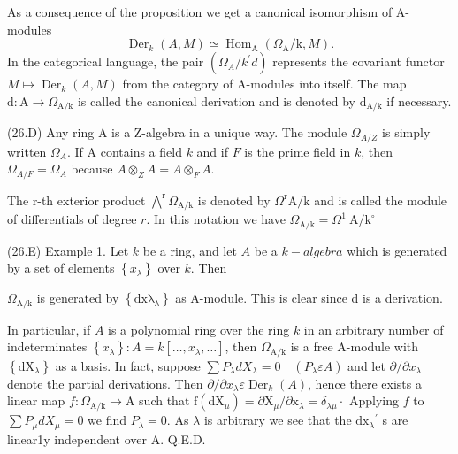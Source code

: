As a consequence of the proposition we get a canonical isomorphism of A-modules
$$
\operatorname{Der}_{k}(A, M) \simeq \operatorname{Hom}_{\mathrm{A}}\left(\Omega_{\mathrm{A}} / \mathrm{k}, M\right) .
$$
In the categorical language, the pair $\left(\Omega_{A} / k^{\prime} d\right)$ represents the covariant functor $M \mapsto \operatorname{Der}_{k}(A, M)$ from the category of A-modules into itself. The map $\mathrm{d}: \mathrm{A} \rightarrow \Omega_{\mathrm{A} / \mathrm{k}}$ is called the canonical derivation and is denoted by $\mathrm{d}_{\mathrm{A} / \mathrm{k}}$ if necessary.

(26.D) Any ring A is a Z-algebra in a unique way. The module $\Omega_{A / Z}$ is simply written $\Omega_{A}$. If A contains a field $k$ and if $F$ is the prime field in $k$, then $\Omega_{A / F}=\Omega_{A}$ because $A \otimes_{Z} A=A \otimes_{F} A$.

The r-th exterior product $\bigwedge^{\mathrm{r}} \Omega_{\mathrm{A} / \mathrm{k}}$ is denoted by $\Omega^{\mathrm{r}} \mathrm{A} / \mathrm{k}$ and is called the module of differentials of degree $r$. In this notation we have $\Omega_{\mathrm{A} / \mathrm{k}}=\Omega^{1} \mathrm{~A} / \mathrm{k}^{\circ}$

(26.E) Example 1. Let $k$ be a ring, and let $A$ be a $k-a l g e b r a$ which is generated by a set of elements $\left\{x_{\lambda}\right\}$ over $k$. Then

$\Omega_{\mathrm{A} / \mathrm{k}}$ is generated by $\left\{\mathrm{dx} \mathrm{\lambda}_{\lambda}\right\}$ as A-module. This is clear since d is a derivation.

In particular, if $A$ is a polynomial ring over the ring $k$ in an arbitrary number of indeterminates $\left\{x_{\lambda}\right\}: A=k\left[\ldots, x_{\lambda}, \ldots\right]$, then $\Omega_{\mathrm{A} / \mathrm{k}}$ is a free $\mathrm{A}$-module with $\left\{\mathrm{dX}_{\lambda}\right\}$ as a basis. In fact, suppose $\sum P_{\lambda} d X_{\lambda}=0 \quad\left(P_{\lambda} \varepsilon A\right)$ and let $\partial / \partial x_{\lambda}$ denote the partial derivations. Then $\partial / \partial x_{\lambda} \varepsilon \operatorname{Der}_{k}(A)$, hence there exists a linear map $f: \Omega_{\mathrm{A} / \mathrm{k}} \rightarrow \mathrm{A}$ such that $\mathrm{f}\left(\mathrm{dX}_{\mu}\right)=\partial \mathrm{X}_{\mu} / \partial \mathrm{x}_{\lambda}=\delta_{\lambda \mu} \cdot$ Applying $f$ to $\sum P_{\mu} d X_{\mu}=0$ we find $P_{\lambda}=0$. As $\lambda$ is arbitrary we see that the $\mathrm{dx}_{\lambda}{ }^{\prime}$ s are linear1y independent over A. Q.E.D.

